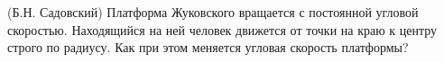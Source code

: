 (Б.Н. Садовский)
Платформа Жуковского вращается с постоянной угловой скоростью. Находящийся
на ней человек движется от точки на краю к центру строго по
радиусу. Как при этом меняется угловая скорость платформы?
